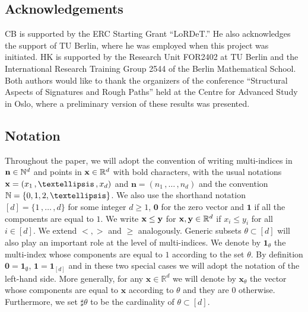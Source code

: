 \documentclass[12pt]{article}
\numberwithin{equation}{section}
\theoremstyle{plain}
\theoremstyle{definition}
\def\bR{\mathbb{R}}\def\bS{\mathbb{S}}
\def\fy{\mathbf y}\def\fz{\mathbf z}
\begin{document}
\subsection*{Acknowledgements}
CB is supported by the ERC Starting Grant “LoRDeT.” He also acknowledges the support of TU Berlin, where he was employed when this project was initiated. HK is supported by the Research Unit FOR2402 at TU Berlin and the International Research Training Group 2544 of the Berlin Mathematical School. Both authors would like to thank the organizers of the conference “Structural Aspects of Signatures and Rough Paths” held at the Centre for Advanced Study in Oslo, where a preliminary version of these results was presented.

\subsection*{Notation}
 Throughout the paper, we will adopt the convention of writing multi-indices in $\mathbf{n}\in\mathbb{N}^d$ and points in $\fx\in \bR^d$ with bold characters, with the usual notations $\fx=(x_1\,, \ldots\,, x_d)$ and $\mathbf{n}=(n_1\,, \ldots \,,n_d) $ and the convention $\bN= \{0,1,2, \ldots\}$. We also use the shorthand notation $[d]= \{1\,,\ldots\,,d\}$ for some integer $d\geq 1$, $\mathbf{0}$ for the zero vector and $\mathbf{1}$ if all the components are equal to $1$.  We write  $\fx\le \fy$ for $ \fx, \fy\in \bR^d $  if $x_i\le y_i$ for all $i\in [d]$. We extend $<,>$ and $\ge$ analogously. Generic  subsets $\theta \subset [d]$ will also play an important role at the level of multi-indices. We denote  by $\mathbf{1}_{\theta}$ the multi-index whose components are equal to $1$ according to the set $\theta$. By definition $\mathbf{0}=\mathbf{1}_{\emptyset}$,  $\mathbf{1}=\mathbf{1}_{[d]}$ and in these two special cases we will adopt the  notation of the left-hand side. More generally, for any $\mathbf{x}\in \mathbb{R}^d$ we will denote by $\mathbf{x}_{\theta}$ the vector whose components are equal to $\mathbf{x} $ according to $\theta$ and they are $0$ otherwise. Furthermore, we set $\sharp\theta$ to be the cardinality of $\theta\subset[d]$.
\end{document}
